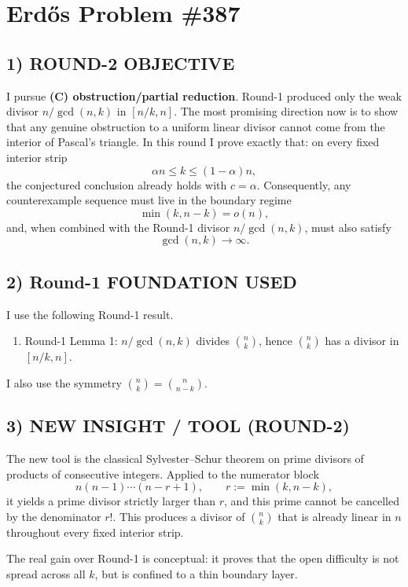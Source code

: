 \section*{Erd\H{o}s Problem \#387}

\subsection*{1) ROUND-2 OBJECTIVE}
I pursue \textbf{(C) obstruction/partial reduction}. Round-1 produced only the weak divisor $n/\gcd(n,k)$ in $[n/k,n]$. The most promising direction now is to show that any genuine obstruction to a uniform linear divisor cannot come from the interior of Pascal's triangle. In this round I prove exactly that: on every fixed interior strip
\[
\alpha n\leq k\leq (1-\alpha)n,
\]
the conjectured conclusion already holds with $c=\alpha$. Consequently, any counterexample sequence must live in the boundary regime
\[
\min(k,n-k)=o(n),
\]
and, when combined with the Round-1 divisor $n/\gcd(n,k)$, must also satisfy
\[
\gcd(n,k)\to\infty.
\]

\subsection*{2) Round-1 FOUNDATION USED}
I use the following Round-1 result.

\begin{enumerate}
\item Round-1 Lemma 1: $n/\gcd(n,k)$ divides $\binom{n}{k}$, hence $\binom{n}{k}$ has a divisor in $[n/k,n]$.
\end{enumerate}

I also use the symmetry $\binom{n}{k}=\binom{n}{n-k}$.

\subsection*{3) NEW INSIGHT / TOOL (ROUND-2)}
The new tool is the classical Sylvester--Schur theorem on prime divisors of products of consecutive integers. Applied to the numerator block
\[
n(n-1)\cdots(n-r+1),\qquad r:=\min(k,n-k),
\]
it yields a prime divisor strictly larger than $r$, and this prime cannot be cancelled by the denominator $r!$. This produces a divisor of $\binom{n}{k}$ that is already linear in $n$ throughout every fixed interior strip.

The real gain over Round-1 is conceptual: it proves that the open difficulty is not spread across all $k$, but is confined to a thin boundary layer.

